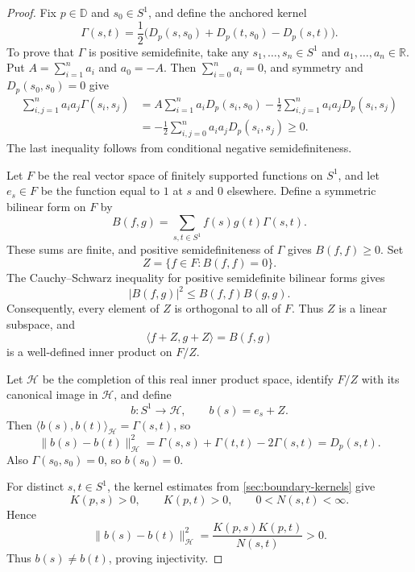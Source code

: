 \begin{proof}
Fix $p\in\mathbb D$ and $s_0\in S^1$, and define the anchored kernel
\[
 \Gamma(s,t)=\frac12\bigl(D_p(s,s_0)+D_p(t,s_0)-D_p(s,t)\bigr).
\]
To prove that $\Gamma$ is positive semidefinite, take any
$s_1,\ldots,s_n\in S^1$ and $a_1,\ldots,a_n\in\mathbb R$.
Put $A=\sum_{i=1}^n a_i$ and $a_0=-A$. Then
$\sum_{i=0}^n a_i=0$, and symmetry and $D_p(s_0,s_0)=0$ give
\begin{align*}
 \sum_{i,j=1}^n a_i a_j\Gamma(s_i,s_j)
 &=A\sum_{i=1}^n a_iD_p(s_i,s_0)
   -\frac12\sum_{i,j=1}^n a_i a_jD_p(s_i,s_j)\\
 &=-\frac12\sum_{i,j=0}^n a_i a_jD_p(s_i,s_j)
 \ge0.
\end{align*}
The last inequality follows from conditional negative semidefiniteness.

Let $F$ be the real vector space of finitely supported functions on
$S^1$, and let $e_s\in F$ be the function equal to $1$ at $s$ and
$0$ elsewhere. Define a symmetric bilinear form on $F$ by
\[
 B(f,g)=\sum_{s,t\in S^1}f(s)g(t)\Gamma(s,t).
\]
These sums are finite, and positive semidefiniteness of $\Gamma$ gives
$B(f,f)\ge0$. Set
\[
 Z=\{f\in F:B(f,f)=0\}.
\]
The Cauchy--Schwarz inequality for positive semidefinite bilinear forms
gives
\[
 |B(f,g)|^2\le B(f,f)B(g,g).
\]
Consequently, every element of $Z$ is orthogonal to all of $F$.
Thus $Z$ is a linear subspace, and
\[
 \langle f+Z,g+Z\rangle=B(f,g)
\]
is a well-defined inner product on $F/Z$.

Let $\mathcal H$ be the completion of this real inner product space,
identify $F/Z$ with its canonical image in $\mathcal H$, and define
\[
 b:S^1\longrightarrow\mathcal H,\qquad b(s)=e_s+Z.
\]
Then $\langle b(s),b(t)\rangle_{\mathcal H}=\Gamma(s,t)$, so
\[
 \|b(s)-b(t)\|_{\mathcal H}^2
 =\Gamma(s,s)+\Gamma(t,t)-2\Gamma(s,t)=D_p(s,t).
\]
Also $\Gamma(s_0,s_0)=0$, so $b(s_0)=0$.

For distinct $s,t\in S^1$, the kernel estimates from \cref{sec:boundary-kernels} give
\[
 K(p,s)>0,\qquad K(p,t)>0,\qquad 0<N(s,t)<\infty.
\]
Hence
\[
 \|b(s)-b(t)\|_{\mathcal H}^2
 =\frac{K(p,s)K(p,t)}{N(s,t)}>0.
\]
Thus $b(s)\ne b(t)$, proving injectivity.


\end{proof}
